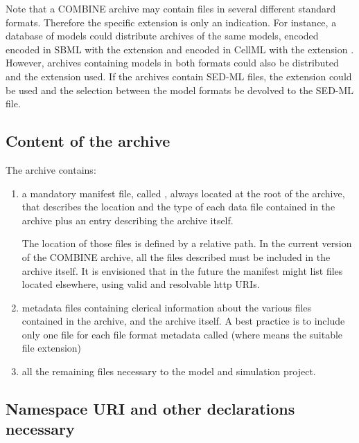 Note that a COMBINE archive may contain files in several different standard formats. Therefore the specific extension is only an indication. For instance, a database of models could distribute archives of the same models, encoded encoded in SBML with the extension  and encoded in CellML with the extension . However, archives containing models in both formats could also be distributed and the extension  used. If the archives contain SED-ML files, the extension  could be used and the selection between the model formats be devolved to the SED-ML file. 

\subsection{Content of the archive}

The archive contains: 

\begin{enumerate}
	\item {
	
     a mandatory manifest file, called , always located at the 
     root of the archive, that describes the location and the type of each 
     data file contained in the archive plus an entry describing 
     the archive itself.
     
     The location of those files is defined by a relative path. In the current 
     version of the COMBINE archive, all the files described must be included 
     in the archive itself. It is envisioned that in the future the manifest 
     might list files located elsewhere, using valid and resolvable http 
     URIs. 

	}
	\item {
     metadata files containing clerical information about the 
     various files contained in the archive, and the archive itself. A best practice is to include only one file for each file format metadata called  (where \token{*} means the 
     suitable file extension)
	}
	\item {all the remaining files necessary to the model and simulation project. }

\end{enumerate}

\subsection{Namespace URI and other declarations necessary}
\label{xml-namespace}

